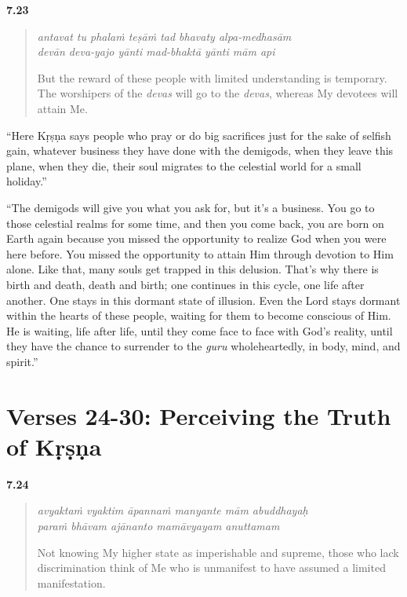 \par\noindent\textbf{7.23}\par
\begin{verse}
\textit{antavat tu phalaṁ teṣāṁ tad bhavaty alpa-medhasām} \\
\textit{devān deva-yajo yānti mad-bhaktā yānti mām api}

\noindent But the reward of these people with limited understanding is temporary. The worshipers of the \textit{devas} will go to the \textit{devas}, whereas My devotees will attain Me.
\end{verse}
\par


\enquote{Here Kṛṣṇa says people who pray or do big sacrifices just for the sake of selfish gain, whatever business they have done with the demigods, when they leave this plane, when they die, their soul migrates to the celestial world for a small holiday.}

\enquote{The demigods will give you what you ask for, but it’s a business. You go to those celestial realms for some time, and then you come back, you are born on Earth again because you missed the opportunity to realize God when you were here before. You missed the opportunity to attain Him through devotion to Him alone. Like that, many souls get trapped in this delusion. That’s why there is birth and death, death and birth; one continues in this cycle, one life after another. One stays in this dormant state of illusion. Even the Lord stays dormant within the hearts of these people, waiting for them to become conscious of Him. He is waiting, life after life, until they come face to face with God’s reality, until they have the chance to surrender to the \textit{guru} wholeheartedly, in body, mind, and spirit.}

\section{Verses 24-30: Perceiving the Truth of Kṛṣṇa}\label{sec-verses-24-30-perceiving-the-truth-of-krsna}


\par\noindent\textbf{7.24}\par
\begin{verse}
\textit{avyaktaṁ vyaktim āpannaṁ manyante mām abuddhayaḥ} \\
\textit{paraṁ bhāvam ajānanto mamāvyayam anuttamam}

\noindent Not knowing My higher state as imperishable and supreme, those who lack discrimination think of Me who is unmanifest to have assumed a limited manifestation.
\end{verse}
\par



